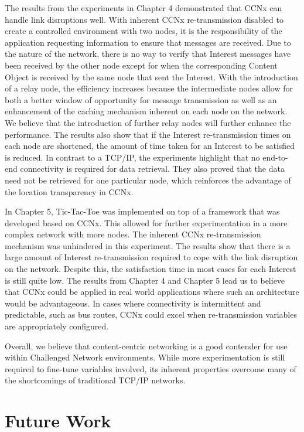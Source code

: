 \documentclass[a4paper,12pt]{report}      %
\begin{document}
The results from the experiments in Chapter 4 demonstrated that CCNx can handle link disruptions well. With inherent CCNx re-transmission
disabled to create a controlled environment with two nodes, it is the responsibility of the application requesting information to ensure that messages are received. Due to the nature of the network, there is no way to verify that Interest messages have been received by the other node except for when the corresponding Content Object is received by the same node that sent the Interest. With the introduction of a relay node, the efficiency increases because the intermediate nodes allow for both a better window of opportunity for message transmission as well as an enhancement of the caching mechanism inherent on each node on the network. We believe that the introduction of further relay nodes will further enhance the performance. The results also show that if the Interest re-transmission times on each node are shortened, the amount of time taken for an Interest to be satisfied is reduced. In contrast to a TCP/IP, the experiments highlight that no end-to-end connectivity is required for data retrieval. They also proved that the data need not be retrieved for one particular node, which reinforces the advantage of the location transparency in CCNx.

In Chapter 5, Tic-Tac-Toe was implemented on top of a framework that was developed based on CCNx. This allowed for further experimentation in a more complex network with more nodes. The inherent CCNx re-transmission mechanism was unhindered in this experiment. The results show that there is a large amount of Interest re-transmission required to cope with the link disruption on the network. Despite this, the satisfaction time in most cases for each Interest is still quite low. The results from Chapter 4 and Chapter 5 lead us to believe that CCNx could be applied in real world applications where such an architecture would be advantageous. In cases where connectivity is intermittent and predictable, such as bus routes, CCNx could excel when re-transmission variables are appropriately configured.

Overall, we believe that content-centric networking is a good contender for use within Challenged Network environments. While more experimentation is still required to fine-tune variables involved, its inherent properties overcome many of the shortcomings of traditional TCP/IP networks. 

\pagebreak
\section{Future Work}
\end{document}
